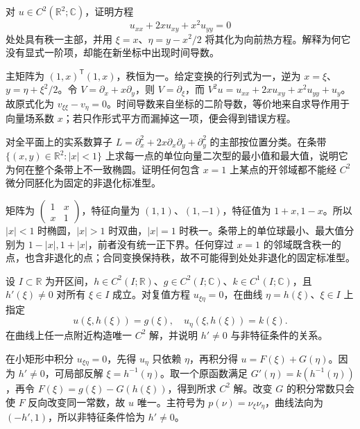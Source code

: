 \begin{exercise}\label{b2:ex:08-parabolic-curvature}
对 \(u\in C^2(\mathbb R^2;\mathbb C)\)，证明方程
\[
 u_{xx}+2x u_{xy}+x^2u_{yy}=0
\]
处处具有秩一主部，并用 \(\xi=x\)、\(\eta=y-x^2/2\) 将其化为向前热方程。解释为何它没有显式一阶项，却能在新坐标中出现时间导数。
\end{exercise}
\begin{solution}
主矩阵为 \((1,x)^{\mathsf T}(1,x)\)，秩恒为一。给定变换的行列式为一，逆为 \(x=\xi\)、\(y=\eta+\xi^2/2\)。令 \(V=\partial_x+x\partial_y\)，则 \(V=\partial_\xi\)，而 \(V^2u=u_{xx}+2x u_{xy}+x^2u_{yy}+u_y\)。故原式化为 \(v_{\xi\xi}-v_\eta=0\)。时间导数来自坐标的二阶导数，等价地来自求导作用于向量场系数 \(x\)；若只作形式平方而漏掉这一项，便会得到错误方程。
\end{solution}

\begin{exercise}\label{b2:ex:08-changing-type}
对全平面上的实系数算子 \(L=\partial_x^2+2x\partial_x\partial_y+\partial_y^2\) 的主部按位置分类。在条带 \(\{(x,y)\in\mathbb R^2:|x|<1\}\) 上求每一点的单位向量二次型的最小值和最大值，说明它为何在整个条带上不一致椭圆。证明任何包含 \(x=1\) 上某点的开邻域都不能经 \(C^2\) 微分同胚化为固定的非退化标准型。
\end{exercise}
\begin{solution}
矩阵为 \(\left(\begin{smallmatrix}1&x\\x&1\end{smallmatrix}\right)\)，特征向量为 \((1,1)\)、\((1,-1)\)，特征值为 \(1+x,1-x\)。所以 \(|x|<1\) 时椭圆，\(|x|>1\) 时双曲，\(|x|=1\) 时秩一。条带上的单位球最小、最大值分别为 \(1-|x|,1+|x|\)，前者没有统一正下界。任何穿过 \(x=1\) 的邻域既含秩一的点，也含非退化的点；合同变换保持秩，故不可能得到处处非退化的固定标准型。
\end{solution}

\begin{exercise}\label{b2:ex:08-curved-cauchy}
设 \(I\subset\mathbb R\) 为开区间，\(h\in C^2(I;\mathbb R)\)、\(g\in C^2(I;\mathbb C)\)、\(k\in C^1(I;\mathbb C)\)，且 \(h'(\xi)\ne0\) 对所有 \(\xi\in I\) 成立。对复值方程 \(u_{\xi\eta}=0\)，在曲线 \(\eta=h(\xi)\)、\(\xi\in I\) 上指定
\[
 u(\xi,h(\xi))=g(\xi),\quad
 u_\eta(\xi,h(\xi))=k(\xi).
\]
在曲线上任一点附近构造唯一 \(C^2\) 解，并说明 \(h'\ne0\) 与非特征条件的关系。
\end{exercise}
\begin{solution}
在小矩形中积分 \(u_{\xi\eta}=0\)，先得 \(u_\eta\) 只依赖 \(\eta\)，再积分得 \(u=F(\xi)+G(\eta)\)。因为 \(h'\ne0\)，可局部反解 \(\xi=h^{-1}(\eta)\)。取一个原函数满足 \(G'(\eta)=k(h^{-1}(\eta))\)，再令 \(F(\xi)=g(\xi)-G(h(\xi))\)，得到所求 \(C^2\) 解。改变 \(G\) 的积分常数只会使 \(F\) 反向改变同一常数，故 \(u\) 唯一。主符号为 \(p(\nu)=\nu_\xi\nu_\eta\)，曲线法向为 \((-h',1)\)，所以非特征条件恰为 \(h'\ne0\)。
\end{solution}

